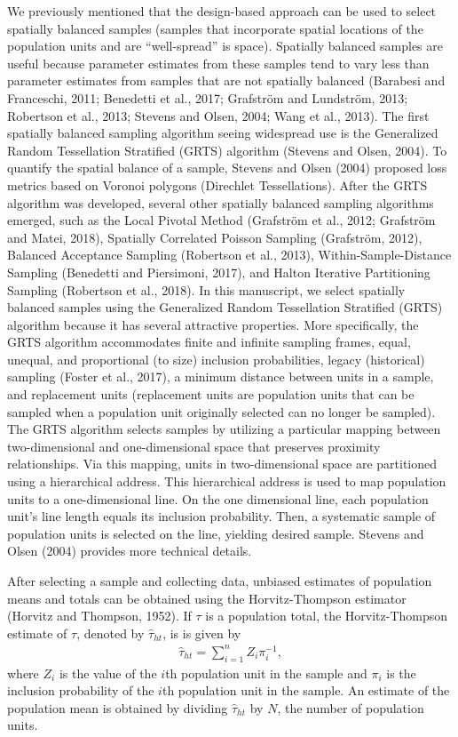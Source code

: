 \documentclass[]{elsarticle} %
\begin{document}
We previously mentioned that the design-based approach can be used to
select spatially balanced samples (samples that incorporate spatial
locations of the population units and are ``well-spread'' is space).
Spatially balanced samples are useful because parameter estimates from
these samples tend to vary less than parameter estimates from samples
that are not spatially balanced (Barabesi and Franceschi, 2011;
Benedetti et al., 2017; Grafström and Lundström, 2013; Robertson et al.,
2013; Stevens and Olsen, 2004; Wang et al., 2013). The first spatially
balanced sampling algorithm seeing widespread use is the Generalized
Random Tessellation Stratified (GRTS) algorithm (Stevens and Olsen,
2004). To quantify the spatial balance of a sample, Stevens and Olsen
(2004) proposed loss metrics based on Voronoi polygons (Direchlet
Tessellations). After the GRTS algorithm was developed, several other
spatially balanced sampling algorithms emerged, such as the Local
Pivotal Method (Grafström et al., 2012; Grafström and Matei, 2018),
Spatially Correlated Poisson Sampling (Grafström, 2012), Balanced
Acceptance Sampling (Robertson et al., 2013), Within-Sample-Distance
Sampling (Benedetti and Piersimoni, 2017), and Halton Iterative
Partitioning Sampling (Robertson et al., 2018). In this manuscript, we
select spatially balanced samples using the Generalized Random
Tessellation Stratified (GRTS) algorithm because it has several
attractive properties. More specifically, the GRTS algorithm
accommodates finite and infinite sampling frames, equal, unequal, and
proportional (to size) inclusion probabilities, legacy (historical)
sampling (Foster et al., 2017), a minimum distance between units in a
sample, and replacement units (replacement units are population units
that can be sampled when a population unit originally selected can no
longer be sampled). The GRTS algorithm selects samples by utilizing a
particular mapping between two-dimensional and one-dimensional space
that preserves proximity relationships. Via this mapping, units in
two-dimensional space are partitioned using a hierarchical address. This
hierarchical address is used to map population units to a
one-dimensional line. On the one dimensional line, each population
unit's line length equals its inclusion probability. Then, a systematic
sample of population units is selected on the line, yielding desired
sample. Stevens and Olsen (2004) provides more technical details.

After selecting a sample and collecting data, unbiased estimates of
population means and totals can be obtained using the Horvitz-Thompson
estimator (Horvitz and Thompson, 1952). If \(\tau\) is a population
total, the Horvitz-Thompson estimate of \(\tau\), denoted by
\(\hat{\tau}_{ht}\), is is given by \begin{align}\label{eq:ht}
  \hat{\tau}_{ht} = \sum_{i = 1}^n Z_i \pi_i^{-1},
\end{align} where \(Z_i\) is the value of the \(i\)th population unit in
the sample and \(\pi_i\) is the inclusion probability of the \(i\)th
population unit in the sample. An estimate of the population mean is
obtained by dividing \(\hat{\tau}_{ht}\) by \(N\), the number of
population units.
\end{document}
